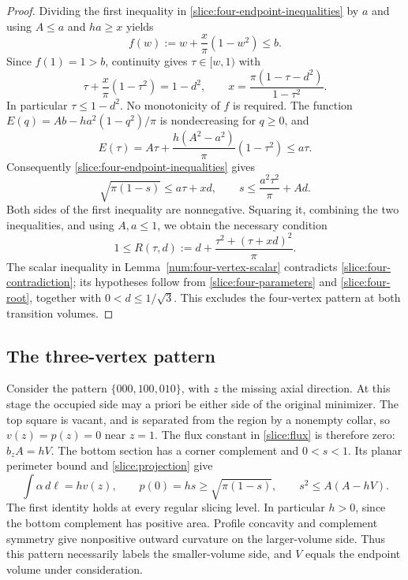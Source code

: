 \begin{proof}
Dividing the first inequality in
\eqref{slice:four-endpoint-inequalities} by $a$ and using $A\le a$
and $ha\ge x$ yields
\[
 f(w):=w+\frac{x}{\pi}(1-w^2)\le b.
\]
Since $f(1)=1>b$, continuity gives $\tau\in[w,1)$ with
\begin{equation}\label{slice:four-root}
 \tau+\frac{x}{\pi}(1-\tau^2)=1-d^2,
 \qquad
 x=\frac{\pi(1-\tau-d^2)}{1-\tau^2}.
\end{equation}
In particular $\tau\le1-d^2$.  No monotonicity of $f$ is required.
The function $E(q)=Ab-ha^2(1-q^2)/\pi$ is nondecreasing for $q\ge0$,
and
\[
 E(\tau)
 =A\tau+\frac{h(A^2-a^2)}{\pi}(1-\tau^2)
 \le a\tau.
\]
Consequently \eqref{slice:four-endpoint-inequalities} gives
\[
 \sqrt{\pi(1-s)}\le a\tau+xd,
 \qquad
 s\le\frac{a^2\tau^2}{\pi}+Ad.
\]
Both sides of the first inequality are nonnegative.  Squaring it,
combining the two inequalities, and using $A,a\le1$, we obtain the
necessary condition
\begin{equation}\label{slice:four-contradiction}
 1\le R(\tau,d):=
 d+\frac{\tau^2+(\tau+xd)^2}{\pi}.
\end{equation}
The scalar inequality in Lemma~\ref{num:four-vertex-scalar}
contradicts \eqref{slice:four-contradiction}; its hypotheses follow from
\eqref{slice:four-parameters} and \eqref{slice:four-root}, together with
$0<d\le1/\sqrt3$.  This excludes the four-vertex pattern at both
transition volumes.
\end{proof}

\subsection{The three-vertex pattern}

Consider the pattern $\{000,100,010\}$, with $z$ the missing axial
direction.  At this stage the occupied side may a priori be either
side of the original minimizer.  The top square is vacant, and is
separated from the region by a nonempty collar, so $v(z)=p(z)=0$ near
$z=1$.  The flux constant in \eqref{slice:flux} is therefore zero:
$b_zA=hV$.  The bottom section has a corner complement and
$0<s<1$.  Its planar perimeter bound and
\eqref{slice:projection} give
\begin{equation}\label{slice:three-flux}
 \int\alpha\,d\ell=hv(z),\qquad
 p(0)=hs\ge\sqrt{\pi(1-s)},\qquad
 s^2\le A(A-hV).
\end{equation}
The first identity holds at every regular slicing level.  In particular
$h>0$, since the bottom complement has positive area.  Profile concavity
and complement symmetry give nonpositive outward curvature on the
larger-volume side.  Thus this pattern necessarily labels the
smaller-volume side, and $V$ equals the endpoint volume under
consideration.

